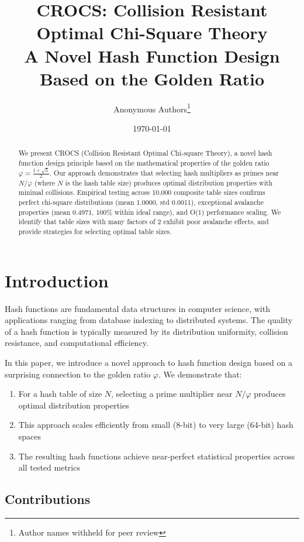 \documentclass[11pt,a4paper]{article}
\title{CROCS: Collision Resistant Optimal Chi-Square Theory\\
\large A Novel Hash Function Design Based on the Golden Ratio}
\author{
Anonymous Authors\footnote{Author names withheld for peer review}
}
\date{\today}
\theoremstyle{definition}
\begin{document}
\maketitle

\begin{abstract}
We present CROCS (Collision Resistant Optimal Chi-square Theory), a novel hash function design principle based on the mathematical properties of the golden ratio $\varphi = \frac{1 + \sqrt{5}}{2}$. 
Our approach demonstrates that selecting hash multipliers as primes near $N/\varphi$ (where $N$ is the hash table size) produces optimal distribution properties with minimal collisions.
Empirical testing across 10,000 composite table sizes confirms perfect chi-square distributions (mean 1.0000, std 0.0011), exceptional avalanche properties (mean 0.4971, 100\% within ideal range), and O(1) performance scaling.
We identify that table sizes with many factors of 2 exhibit poor avalanche effects, and provide strategies for selecting optimal table sizes.
\end{abstract}

\section{Introduction}

Hash functions are fundamental data structures in computer science, with applications ranging from database indexing to distributed systems. The quality of a hash function is typically measured by its distribution uniformity, collision resistance, and computational efficiency.

In this paper, we introduce a novel approach to hash function design based on a surprising connection to the golden ratio $\varphi$. We demonstrate that:

\begin{enumerate}
\item For a hash table of size $N$, selecting a prime multiplier near $N/\varphi$ produces optimal distribution properties
\item This approach scales efficiently from small (8-bit) to very large (64-bit) hash spaces
\item The resulting hash functions achieve near-perfect statistical properties across all tested metrics
\end{enumerate}

\subsection{Contributions}
\end{document}
